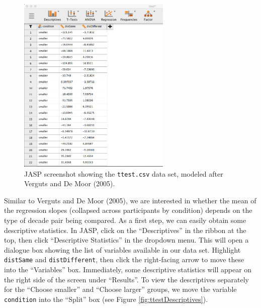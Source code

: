 \documentclass[english,,doc,floatsintext]{apa6}
\begin{document}
\begin{figure}
\centering
\includegraphics[width=0.65\textwidth,height=\textheight]{figures/ttestData.png}
\caption{\label{fig:ttestData}JASP screenshot showing the \texttt{ttest.csv} data set, modeled after Verguts and De Moor (2005).}
\end{figure}

Similar to Verguts and De Moor (2005), we are interested in whether the mean of the regression slopes (collapsed across participants by condition) depends on the type of decade pair being compared. As a first step, we can easily obtain some descriptive statistics. In JASP, click on the \enquote{Descriptives} in the ribbon at the top, then click \enquote{Descriptive Statistics} in the dropdown menu. This will open a dialogue box showing the list of variables available in our data set. Highlight \texttt{distSame} and \texttt{distDifferent}, then click the right-facing arrow to move these into the \enquote{Variables} box. Immediately, some descriptive statistics will appear on the right side of the screen under \enquote{Results}. To view the descriptives separately for the \enquote{Choose smaller} and \enquote{Choose larger} groups, we move the variable \texttt{condition} into the \enquote{Split} box (see Figure \ref{fig:ttestDescriptives}).
\end{document}
